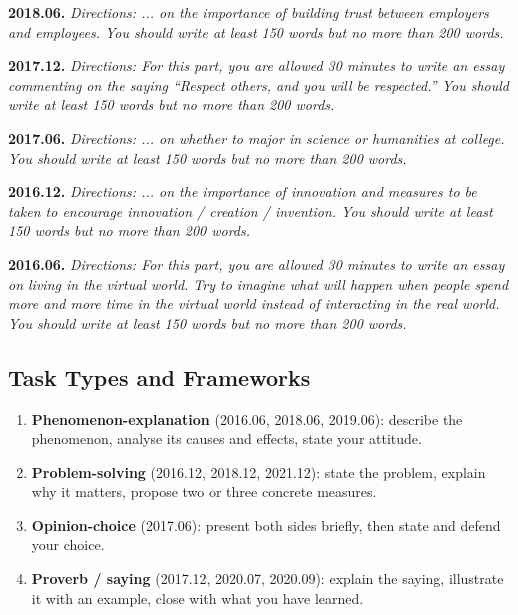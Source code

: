\noindent\textbf{2018.06.}\quad
\emph{Directions: ... on the importance of building trust between employers and employees. You should write at least 150 words but no more than 200 words.}
\par\medskip

\noindent\textbf{2017.12.}\quad
\emph{Directions: For this part, you are allowed 30 minutes to write an essay commenting on the saying ``Respect others, and you will be respected.'' You should write at least 150 words but no more than 200 words.}
\par\medskip

\noindent\textbf{2017.06.}\quad
\emph{Directions: ... on whether to major in science or humanities at college. You should write at least 150 words but no more than 200 words.}
\par\medskip

\noindent\textbf{2016.12.}\quad
\emph{Directions: ... on the importance of innovation and measures to be taken to encourage innovation / creation / invention. You should write at least 150 words but no more than 200 words.}
\par\medskip

\noindent\textbf{2016.06.}\quad
\emph{Directions: For this part, you are allowed 30 minutes to write an essay on living in the virtual world. Try to imagine what will happen when people spend more and more time in the virtual world instead of interacting in the real world. You should write at least 150 words but no more than 200 words.}
\par\medskip

\subsection{Task Types and Frameworks}

\begin{enumerate}[leftmargin=1.6em]
  \item \textbf{Phenomenon-explanation} (2016.06, 2018.06, 2019.06): describe the phenomenon, analyse its causes and effects, state your attitude.
  \item \textbf{Problem-solving} (2016.12, 2018.12, 2021.12): state the problem, explain why it matters, propose two or three concrete measures.
  \item \textbf{Opinion-choice} (2017.06): present both sides briefly, then state and defend your choice.
  \item \textbf{Proverb / saying} (2017.12, 2020.07, 2020.09): explain the saying, illustrate it with an example, close with what you have learned.
\end{enumerate}

